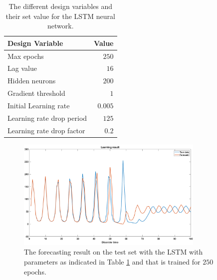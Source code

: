 \documentclass[a4paper,10pt]{article}
\begin{document}
\begin{table}
	\centering
	\begin{tabular}{@{}lr@{}} \toprule
		\textbf{Design Variable}    & Value \\\midrule
		Max epochs & $ 250 $\\
		Lag value & $ 16 $\\
		Hidden neurons & $ 200 $\\
		Gradient threshold & $ 1 $\\
		Initial Learning rate & $ 0.005 $ \\ 
		Learning rate drop period & $ 125 $\\
		Learning rate drop factor & $ 0.2 $  \\\bottomrule
	\end{tabular}
	\caption{The different design variables and their set value for the LSTM neural network.}
	\label{tab:design_LSTM}
\end{table}  


\begin{figure}[h!]
	\centering
	\includegraphics[width=0.8\textwidth]{LSTM_result.png}
	\caption{The forecasting result on the test set with the LSTM with parameters as indicated in Table \ref{tab:design_LSTM} and that is trained for $ 250 $ epochs.}
	\label{fig:LSTM_result}
\end{figure}




%
\end{document}

